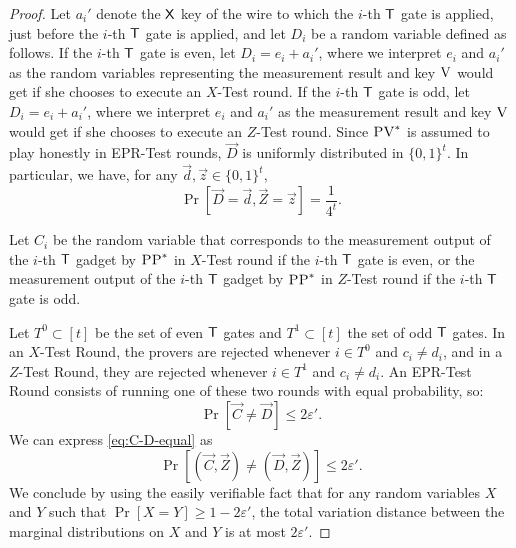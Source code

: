 \documentclass[11pt,letter]{article}
\theoremstyle{remark}
\theoremstyle{definition}
\newcommand{\eps}{\varepsilon}
\newcommand{\ver}{\textsc{V}}
\newcommand{\pv}{\textsc{PV}}
\newcommand{\pp}{\textsc{PP}}
\begin{document}
\begin{proof}
Let $a_i'$ denote the $\sf X$ key of the wire to which the $i$-th $\sf T$ gate is applied, just before the $i$-th $\sf T$ gate is applied, and let $D_i$ be a random variable defined as follows. If the $i$-th $\sf T$ gate is even, let $D_i=e_i+a_i'$, where we interpret $e_i$ and $a_i'$ as the random variables representing the measurement result and key $\ver$ would get if she chooses to execute an $X$-Test round. If the $i$-th $\sf T$ gate is odd, let $D_i=e_i+a_i'$, where we interpret $e_i$ and $a_i'$ as the measurement result and key $\ver$ would get if she chooses to execute an $Z$-Test round. Since $\pv^*$ is assumed to play honestly in EPR-Test rounds, $\vec{D}$ is uniformly distributed in $\{0,1\}^t$. In particular, we have, for any $\vec{d},\vec{z}\in\{0,1\}^t$,
\begin{equation}
\Pr[\vec{D}=\vec{d},\vec{Z}=\vec{z}]=\frac{1}{4^t}.\label{eq:D-unif}
\end{equation}

Let $C_i$ be the random variable that corresponds to the measurement output of
  the $i$-th $\sf T$ gadget by $\pp^*$ in $X$-Test round if the $i$-th $\sf T$
  gate is even, or the measurement output of the $i$-th $\sf T$ gadget 
  by $\pp^*$ in $Z$-Test round if the $i$-th $\sf T$ gate is odd.

Let $T^0\subset[t]$ be the set of even $\sf T$ gates and $T^1\subset[t]$ the set of odd $\sf T$ gates. In an $X$-Test Round, the provers are rejected whenever $i\in T^0$ and $c_i\neq d_i$, and in a $Z$-Test Round, they are rejected whenever $i\in T^1$ and $c_i\neq d_i$. An EPR-Test Round consists of running one of these two rounds with equal probability, so:
\begin{equation}
\Pr[\vec{C}\neq\vec{D}]  \leq  2\eps'.\label{eq:C-D-equal}
\end{equation}
We can express \eqref{eq:C-D-equal} as
\begin{equation*}
\Pr[(\vec{C},\vec{Z})\neq(\vec{D},\vec{Z})]  \leq  2\eps'.
\end{equation*}
We conclude by using the easily verifiable fact that for any random variables $X$ and $Y$ such that $\Pr[X= Y]\geq 1-2\eps'$, the total variation distance between the marginal distributions on $X$ and $Y$ is at most $2\eps'$. 


\end{proof}
\end{document}
